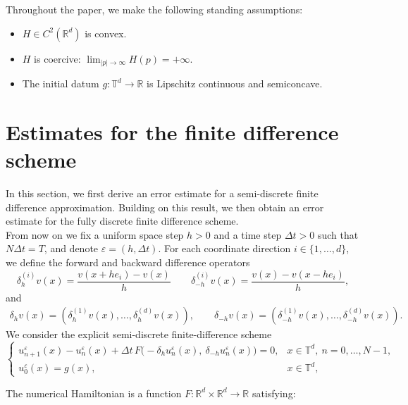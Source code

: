 \documentclass[11pt]{amsart}
\theoremstyle{remark}
\theoremstyle{definition}
\theoremstyle{Claim}
\theoremstyle{plain}
\begin{document}
Throughout the paper, we make the following standing assumptions:
\begin{itemize}
	\item[(H1)] $H\in C^2(\mathbb{R}^d)$ is convex.
	\item[(H2)] $H$ is coercive: \(\displaystyle\lim_{|p|\to\infty}H(p)=+\infty\).
	\item[(G1)] The initial datum \(g:\mathbb{T}^d\to\mathbb{R}\) is Lipschitz continuous and semiconcave.
\end{itemize}

\section{Estimates for the finite difference scheme}\label{sec:finite_difference}
In this section, we first derive an error estimate for a semi-discrete finite difference approximation. Building on this result, we then obtain an error estimate for the fully discrete finite difference scheme.\\
From now on we fix a uniform space step \(h>0\) and a time step \(\Delta t>0\) such that \(N\Delta t=T\), and denote \(\varepsilon=(h,\Delta t)\). For each coordinate direction $i\in\{1,\dots,d\}$, we define the forward and backward difference operators
\[
\delta_{h}^{(i)} v(x) = \frac{v(x+h e_i)-v(x)}{h}\qquad
\delta_{-h}^{(i)} v(x) = \frac{v(x)-v(x-h e_i)}{h},
\]
and
\begin{align*}
\delta_{h}  v(x)=( \delta_{h}^{(1)} v(x), \dots, \delta_{h}^{(d)} v(x) ),\qquad
\delta_{-h}  v(x)=( \delta_{-h}^{(1)} v(x), \dots, \delta_{-h}^{(d)} v(x) ).
\end{align*}
We consider the explicit semi-discrete finite-difference scheme 
\begin{equation}\label{HJ_app_d}
\begin{cases}
u^\varepsilon_{n+1}(x)-u^\varepsilon_n(x) + \Delta t\, F\big(-\delta_{h} u^\varepsilon_n(x),\ \delta_{-h} u^\varepsilon_n(x)\big)=0, & x\in\mathbb{T}^d,\ n=0,\dots,N-1,\\[4pt]
u^\varepsilon_0(x)=g(x), & x\in\mathbb{T}^d,
\end{cases}
\end{equation}

The numerical Hamiltonian is a function \(F:\mathbb{R}^d\times\mathbb{R}^d\to\mathbb{R}\) satisfying:
\end{document}
